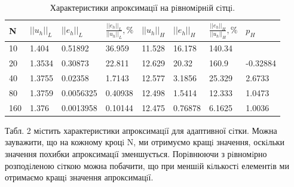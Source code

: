 \documentclass[a4paper]{article}
\numberwithin{equation}{section}
\begin{document}
\begin{table}[H]
\centering
\begin{tabular}{|l|l|l|l|l|l|l|l|}
\hline
N   & $||u_h||_L$ & $||e_h||_L$ & $\frac{||e_h||_L}{||u_h||_L}, \%$ & $||u_h||_H$ & $||e_h||_H$ & $\frac{||e_h||_H}{||u_h||_H}, \%$ & $p_H$    \\ \hline
10  & 1.404       & 0.51892     & 36.959                            & 11.528      & 16.178      & 140.34                            &          \\ \hline
20  & 1.3534      & 0.30873     & 22.811                            & 12.629      & 20.32       & 160.9                             & -0.32884 \\ \hline
40  & 1.3755      & 0.02358     & 1.7143                            & 12.577      & 3.1856      & 25.329                            & 2.6733   \\ \hline
80  & 1.3759      & 0.0056325   & 0.40938                           & 12.498      & 1.5414      & 12.333                            & 1.0473   \\ \hline
160 & 1.376       & 0.0013958   & 0.10144                           & 12.475      & 0.76878     & 6.1625                            & 1.0036   \\ \hline
\end{tabular}
\caption{Характеристики апроксимацiї на рiвномiрнiй сiтцi.}
\end{table}
Табл. 2 мiстить характеристики апроксимацiї для адаптивної сiтки. Можна зауважити, що на кожному кроцi N, ми отримуємо кращi значення, оскiльки значення похибки апроксимацiї зменшу\-ється. Порiвнюючи з рiвномiрно розподiленою сiткою можна побачити, що при меншiй кiлькостi елементiв ми отримаємо кращi значення апроксимацiї.
\end{document}
